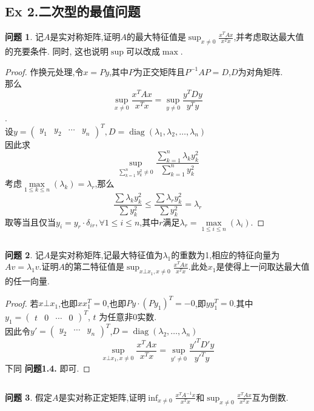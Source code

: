 \documentclass[11pt]{ctexart}
\theoremstyle{definition}
\newtheorem{qqq}{问题}[section]
\numberwithin{equation}{section}
\newcommand{\op}[1]{\operatorname{#1}}%
\begin{document}
\subsection{Ex 2.二次型的最值问题}
\begin{qqq}
     记$A$是实对称矩阵,证明$A$的最大特征值是$\sup_{x\neq 0}\frac{x^TAx}{x^Tx}$,并考虑取达最大值的充要条件. 同时, 这也说明$\sup$可以改成$\max$.
\end{qqq}
\begin{proof}
    作换元处理,令$x=Py$,其中$P$为正交矩阵且$P^{-1}AP=D$,$D$为对角矩阵.\\那么$$\sup_{x\neq 0} \frac{x^TAx}{x^Tx}=\sup_{y\neq 0} \frac{y^TDy}{y^Ty}$$.\\
    设$y=\begin{pmatrix}
        y_1&y_2&\cdots&y_n
    \end{pmatrix}^T,D=\op{diag}(\lambda_1,\lambda_2,\ldots,\lambda_n)$\\
    因此求$$\sup _{\sum\limits_{k=1}^n y_k^2\neq 0}\frac{\sum_{k=1}^n \lambda_ky_k^2}{\sum_{k=1}^n y_k^2}$$
    考虑$\max\limits_{1\leq k \leq n}(\lambda_k)=\lambda_r$,那么$$\frac{\sum \lambda_ky_k^2}{\sum y_k^2}\leq \frac{\sum \lambda_ry_k^2}{\sum y_k^2}=\lambda_r$$
    取等当且仅当$y_i=y_r\cdot \delta_{ir},\forall 1\leq i\leq n$,其中$r$满足$\lambda_r=\max\limits_{1\leq i \leq n}(\lambda_i)$.
\end{proof}
\[{}\]
\begin{qqq}
    记$A$是实对称矩阵,记最大特征值为$\lambda_1$的重数为1,相应的特征向量为$Av=\lambda_1v$.证明$A$的第二特征值是$\sup _{x \bot x_1,x\neq 0}\frac{x^TAx}{x^Tx}$.此处$x_1$是使得上一问取达最大值的任一向量.
\end{qqq}
\begin{proof}
    若$x\bot x_1$,也即$xx_1^T=0$,也即$Py\cdot(Py_1)^T=-0$,即$yy_1^T=0$.其中$y_1=\begin{pmatrix}t&0&\cdots&0\end{pmatrix}^T$, $t$ 为任意非0实数.\\
    因此令$y'=\begin{pmatrix}
        y_2&\cdots&y_n
    \end{pmatrix}^T$,$D=\op{diag}(\lambda_2,\ldots,\lambda_n)$\\
    $$\sup _{x \bot x_1,x\neq 0}\frac{x^TAx}{x^Tx}=\sup_{y'\neq 0}\frac{y'^TD'y}{y'^Ty}$$
    下同 \textbf{问题1.4.} 即可.
\end{proof}
\[{}\]
\begin{qqq}
    假定$A$是实对称正定矩阵,证明$\inf _{x\neq 0}\frac{x^TA^{-1}x}{x^Tx}$和$\sup _{x\neq 0}\frac{x^TAx}{x^Tx}$互为倒数.
\end{qqq}
\end{document}
